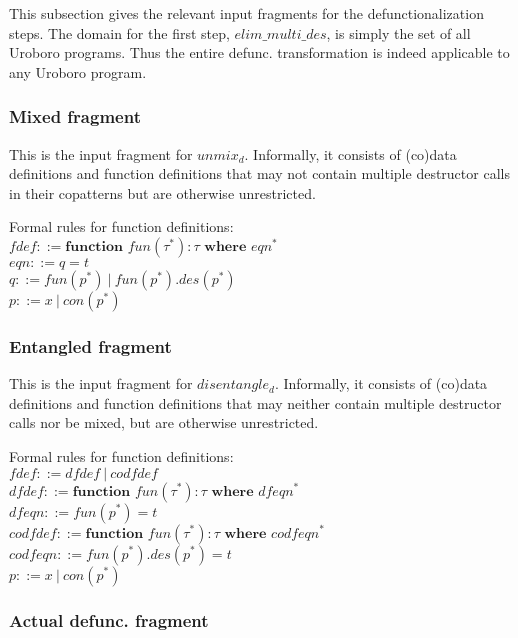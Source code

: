 \documentclass[11pt]{article} %
\begin{document}
This subsection gives the relevant input fragments for the defunctionalization steps. The domain for the first step, $elim\_multi\_des$, is simply the set of all Uroboro programs. Thus the entire defunc. transformation is indeed applicable to any Uroboro program.

\subsubsection{Mixed fragment}

This is the input fragment for $unmix_d$. Informally, it consists of (co)data definitions and function definitions that may not contain multiple destructor calls in their copatterns but are otherwise unrestricted. 

Formal rules for function definitions:\\
$fdef ::= \textbf{function } fun(\tau^*): \tau \textbf{ where } eqn^*$\\
$eqn ::= q = t$\\
$q ::= fun(p^*) ~ | ~ fun(p^*).des(p^*)$\\
$p ::= x ~ | ~ con(p^*) $\\

\subsubsection{Entangled fragment}

This is the input fragment for $disentangle_d$. Informally, it consists of (co)data definitions and function definitions that may neither contain multiple destructor calls nor be mixed, but are otherwise unrestricted.

Formal rules for function definitions:\\
$fdef ::= dfdef ~ | ~ codfdef$\\
$dfdef ::= \textbf{function } fun(\tau^*): \tau \textbf{ where } dfeqn^*$\\
$dfeqn ::= fun(p^*) = t$\\
$codfdef ::= \textbf{function } fun(\tau^*): \tau \textbf{ where } codfeqn^*$\\
$codfeqn ::= fun(p^*).des(p^*) = t$\\
$p ::= x ~ | ~ con(p^*) $\\

\subsubsection{Actual defunc. fragment}
\end{document}
